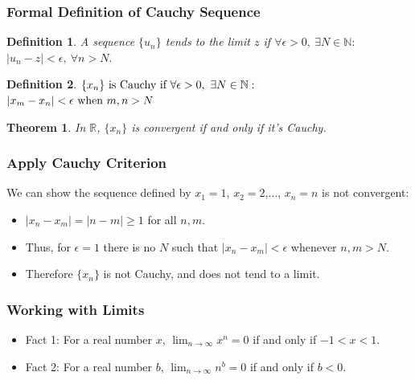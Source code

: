 \documentclass{beamer}
\newtheorem{thm}{Theorem}
\newtheorem{defn}{Definition}
\numberwithin{equation}{section}
\begin{document}
\begin{frame}
\frametitle{Formal Definition of Cauchy Sequence}

\begin{defn}
A sequence $\{ u_{n} \}$ tends to the limit $z$ if $\forall \epsilon>0,\ \exists N\in \mathbb{N}:$\\ $|u_n-z|<\epsilon,\ \forall n>N.$\pause
\end{defn}

\begin{defn}
$\{x_n\} \hbox{ is Cauchy if } \forall\epsilon>0,\ \exists N\in \mathbb{N}:$\\$|x_{m} - x_{n}|<\epsilon \hbox{ when }m, n>N$
\end{defn}

\begin{thm}
In $\mathbb{R}$, $\{x_{n} \}$ is convergent if and only if it's Cauchy.
\end{thm}

\end{frame}


\begin{frame}
\frametitle{Apply Cauchy Criterion}

We can show the sequence defined by $x_1=1$, $x_2=2$,$\ldots$, $x_n=n$ is not convergent: \pause
\begin{itemize}
\item $|x_n-x_m|=|n-m|\geq 1$ for all $n, m$.\pause
\item Thus, for $\epsilon=1$ there is no $N$ such that $|x_n-x_m|<\epsilon$ whenever $n, m>N$.  \pause
\item  Therefore $\{x_n\}$ is not Cauchy, and does not tend to a limit.
\end{itemize}
\end{frame}


\begin{frame}
\frametitle{Working with Limits}

\begin{itemize}
\item Fact 1: For a real number $x$, $\lim_{n\rightarrow\infty}x^n=0$ if and only if $-1<x<1$. \pause
\item Fact 2: For a real number $b$, $\lim_{n\rightarrow\infty}n^b=0$ if and only if $b<0$.
\end{itemize}

\end{frame}
\end{document}
